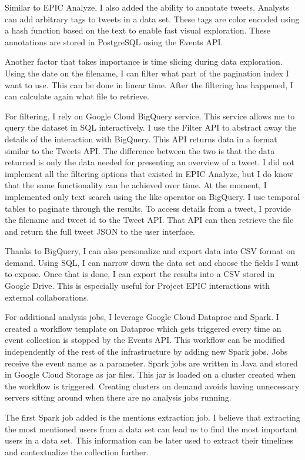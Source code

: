 Similar to EPIC Analyze, I also added the ability to annotate tweets. Analysts can add arbitrary tags to tweets in a data set. These tags are color encoded using a hash function based on the text to enable fast visual exploration. These annotations are stored in PostgreSQL using the Events API.

Another factor that takes importance is time slicing during data exploration. Using the date on the filename, I can filter what part of the pagination index I want to use. This can be done in linear time. After the filtering has happened, I can calculate again what file to retrieve.

For filtering, I rely on Google Cloud BigQuery service. This service allows me to query the dataset in SQL interactively. I use the Filter API to abstract away the details of the interaction with BigQuery. This API returns data in a format similar to the Tweets API. The difference between the two is that the data returned is only the data needed for presenting an overview of a tweet. I did not implement all the filtering options that existed in EPIC Analyze, but I do know that the same functionality can be achieved over time. At the moment, I implemented only text search using the like operator on BigQuery. I use temporal tables to paginate through the results. To access details from a tweet, I provide the filename and tweet id to the Tweet API. That API can then retrieve the file and return the full tweet JSON to the user interface.

Thanks to BigQuery, I can also personalize and export data into CSV format on demand. Using SQL, I can narrow down the data set and choose the fields I want to expose. Once that is done, I can export the results into a CSV stored in Google Drive. This is especially useful for Project EPIC interactions with external collaborations.

For additional analysis jobs, I leverage Google Cloud Dataproc and Spark. I created a workflow template on Dataproc which gets triggered every time an event collection is stopped by the Events API. This workflow can be modified independently of the rest of the infrastructure by adding new Spark jobs. Jobs receive the event name as a parameter. Spark jobs are written in Java and stored in Google Cloud Storage as jar files. This jar is loaded on a cluster created when the workflow is triggered. Creating clusters on demand avoids having unnecessary servers sitting around when there are no analysis jobs running.

The first Spark job added is the mentions extraction job. I believe that extracting the most mentioned users from a data set can lead us to find the most important users in a data set. This information can be later used to extract their timelines and contextualize the collection further. 

